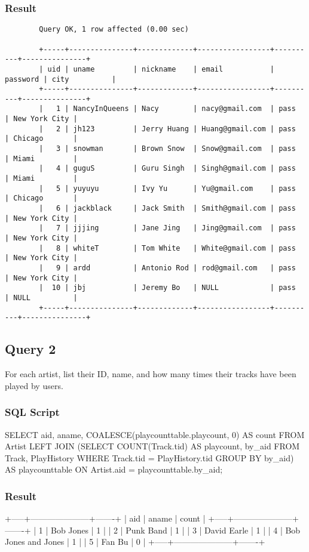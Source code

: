 \documentclass[letterpaper, 12pt]{report}
\begin{document}
	\subsubsection{Result}
	\begin{verbatim}
		Query OK, 1 row affected (0.00 sec)
		
		+-----+---------------+-------------+-----------------+----------+---------------+
		| uid | uname         | nickname    | email           | password | city          |
		+-----+---------------+-------------+-----------------+----------+---------------+
		|   1 | NancyInQueens | Nacy        | nacy@gmail.com  | pass     | New York City |
		|   2 | jh123         | Jerry Huang | Huang@gmail.com | pass     | Chicago       |
		|   3 | snowman       | Brown Snow  | Snow@gmail.com  | pass     | Miami         |
		|   4 | guguS         | Guru Singh  | Singh@gmail.com | pass     | Miami         |
		|   5 | yuyuyu        | Ivy Yu      | Yu@gmail.com    | pass     | Chicago       |
		|   6 | jackblack     | Jack Smith  | Smith@gmail.com | pass     | New York City |
		|   7 | jjjing        | Jane Jing   | Jing@gmail.com  | pass     | New York City |
		|   8 | whiteT        | Tom White   | White@gmail.com | pass     | New York City |
		|   9 | ardd          | Antonio Rod | rod@gmail.com   | pass     | New York City |
		|  10 | jbj           | Jeremy Bo   | NULL            | pass     | NULL          |
		+-----+---------------+-------------+-----------------+----------+---------------+
	\end{verbatim}
	
	\subsection{Query 2}
	For each artist, list their ID, name, and how many times their tracks have been played by users.
	\subsubsection{SQL Script}
	\begin{spverbatim}
		SELECT aid, aname, COALESCE(playcounttable.playcount, 0) AS count 
		FROM Artist LEFT JOIN
		(SELECT COUNT(Track.tid) AS playcount, by_aid 
		FROM Track, PlayHistory
		WHERE Track.tid = PlayHistory.tid
		GROUP BY by_aid) AS playcounttable
		ON Artist.aid = playcounttable.by_aid;
	\end{spverbatim}
	\subsubsection{Result}
	\begin{spverbatim}
		+-----+---------------------+-------+
		| aid | aname               | count |
		+-----+---------------------+-------+
		|   1 | Bob Jones           |     1 |
		|   2 | Punk Band           |     1 |
		|   3 | David Earle         |     1 |
		|   4 | Bob Jones and Jones |     1 |
		|   5 | Fan Bu              |     0 |
		+-----+---------------------+-------+
	\end{spverbatim}
	
\end{document}
